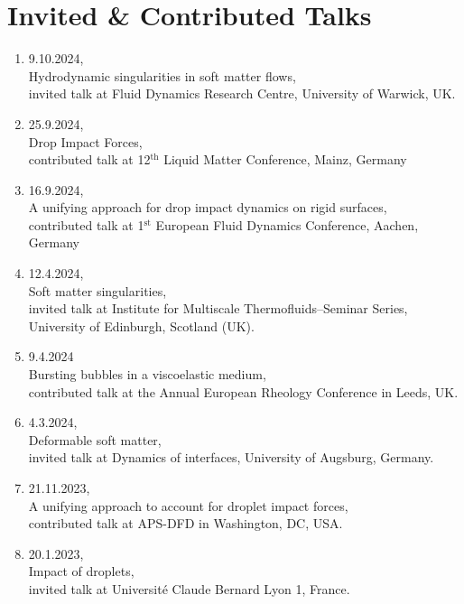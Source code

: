 \documentclass[11pt,a4paper,roman,english,colorlinks,linkcolor={red!50!black}]{moderncv}
\begin{document}
\section{\textbf{Invited \& Contributed Talks}}
\begin{enumerate}[leftmargin=0.75cm]
	\item 9.10.2024,\\
	Hydrodynamic singularities in soft matter flows,\\
	invited talk at Fluid Dynamics Research Centre, University of Warwick, UK.

	\item 25.9.2024,\\
	Drop Impact Forces,\\
	contributed talk at 12$^\text{th}$ Liquid Matter Conference, Mainz, Germany

	\item 16.9.2024,\\
	A unifying approach for drop impact dynamics on rigid surfaces,\\
	contributed talk at 1$^\text{st}$ European Fluid Dynamics Conference, Aachen, Germany

	\item 12.4.2024,\\
	Soft matter singularities,\\
	invited talk at Institute for Multiscale Thermofluids--Seminar Series, University of Edinburgh, Scotland (UK).

	\item 9.4.2024\\
	Bursting bubbles in a viscoelastic medium,\\
	contributed talk at the Annual European Rheology Conference in Leeds, UK.

	\item 4.3.2024,\\
	Deformable soft matter,\\
	invited talk at Dynamics of interfaces, University of Augsburg, Germany.

	\item 21.11.2023,\\
	A unifying approach to account for droplet impact forces,\\
	contributed talk at APS-DFD in Washington, DC, USA.

	\item 20.1.2023,\\
	Impact of droplets,\\
	invited talk at Universit\'e Claude Bernard Lyon 1, France.


\end{enumerate}
\end{document}
